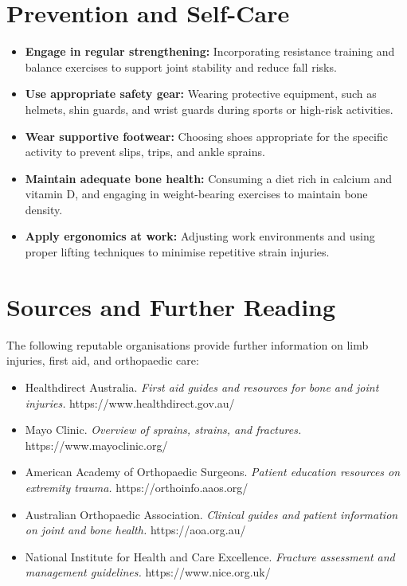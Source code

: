 \section*{Prevention and Self-Care}
\begin{itemize}
    \item \textbf{Engage in regular strengthening:} Incorporating resistance training and balance exercises to support joint stability and reduce fall risks.
    \item \textbf{Use appropriate safety gear:} Wearing protective equipment, such as helmets, shin guards, and wrist guards during sports or high-risk activities.
    \item \textbf{Wear supportive footwear:} Choosing shoes appropriate for the specific activity to prevent slips, trips, and ankle sprains.
    \item \textbf{Maintain adequate bone health:} Consuming a diet rich in calcium and vitamin D, and engaging in weight-bearing exercises to maintain bone density.
    \item \textbf{Apply ergonomics at work:} Adjusting work environments and using proper lifting techniques to minimise repetitive strain injuries.
\end{itemize}

\section*{Sources and Further Reading}
The following reputable organisations provide further information on limb injuries, first aid, and orthopaedic care:
\begin{itemize}
    \item Healthdirect Australia. \textit{First aid guides and resources for bone and joint injuries.} https://www.healthdirect.gov.au/
    \item Mayo Clinic. \textit{Overview of sprains, strains, and fractures.} https://www.mayoclinic.org/
    \item American Academy of Orthopaedic Surgeons. \textit{Patient education resources on extremity trauma.} https://orthoinfo.aaos.org/
    \item Australian Orthopaedic Association. \textit{Clinical guides and patient information on joint and bone health.} https://aoa.org.au/
    \item National Institute for Health and Care Excellence. \textit{Fracture assessment and management guidelines.} https://www.nice.org.uk/
\end{itemize}
